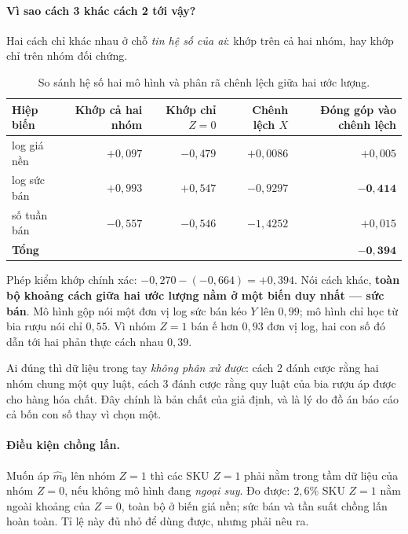 \documentclass[11pt]{article}
\begin{document}
\paragraph{Vì sao cách 3 khác cách 2 tới vậy?} Hai cách chỉ khác nhau ở chỗ \emph{tin hệ số của
ai}: khớp trên cả hai nhóm, hay khớp chỉ trên nhóm đối chứng.

\begin{table}[htbp]
  \centering
  \caption{So sánh hệ số hai mô hình và phân rã chênh lệch giữa hai ước lượng.}
  \label{tab:so-he-so}
  \begin{tabular}{lrrrr}
    \toprule
    Hiệp biến & Khớp cả hai nhóm & Khớp chỉ $Z=0$ & Chênh lệch $X$ & Đóng góp vào chênh lệch \\
    \midrule
    log giá nền & $+0{,}097$ & $-0{,}479$ & $+0{,}0086$ & $+0{,}005$ \\
    log sức bán & $+0{,}993$ & $+0{,}547$ & $-0{,}9297$ & $\mathbf{-0{,}414}$ \\
    số tuần bán & $-0{,}557$ & $-0{,}546$ & $-1{,}4252$ & $+0{,}015$ \\
    \midrule
    \textbf{Tổng} & & & & $\mathbf{-0{,}394}$ \\
    \bottomrule
  \end{tabular}
\end{table}

Phép kiểm khớp chính xác: $-0{,}270 - (-0{,}664) = +0{,}394$. Nói cách khác,
\textbf{toàn bộ khoảng cách giữa hai ước lượng nằm ở một biến duy nhất --- sức bán}. Mô hình gộp
nói một đơn vị log sức bán kéo $Y$ lên $0{,}99$; mô hình chỉ học từ bia rượu nói chỉ $0{,}55$. Vì
nhóm $Z=1$ bán ế hơn $0{,}93$ đơn vị log, hai con số đó dẫn tới hai phản thực cách nhau $0{,}39$.

Ai đúng thì dữ liệu trong tay \emph{không phân xử được}: cách 2 đánh cược rằng hai nhóm chung một
quy luật, cách 3 đánh cược rằng quy luật của bia rượu áp được cho hàng hóa chất. Đây chính là bản
chất của giả định, và là lý do đồ án báo cáo cả bốn con số thay vì chọn một.

\paragraph{Điều kiện chồng lấn.} Muốn áp $\hat m_0$ lên nhóm $Z=1$ thì các SKU $Z=1$ phải nằm
trong tầm dữ liệu của nhóm $Z=0$, nếu không mô hình đang \emph{ngoại suy}. Đo được: $2{,}6\%$ SKU
$Z=1$ nằm ngoài khoảng của $Z=0$, toàn bộ ở biến giá nền; sức bán và tần suất chồng lấn hoàn toàn.
Tỉ lệ này đủ nhỏ để dùng được, nhưng phải nêu ra.
\end{document}
